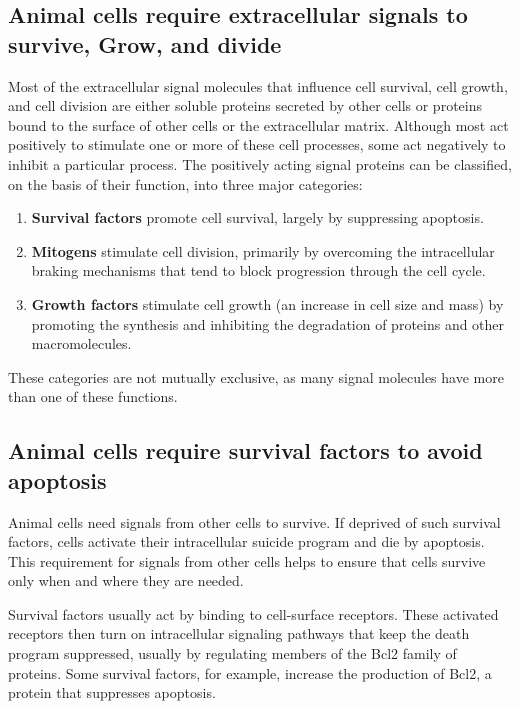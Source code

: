\subsection{Animal cells require extracellular signals to survive, Grow, and divide}

Most of the extracellular signal molecules that influence cell survival, cell
growth, and cell division are either soluble proteins secreted by other
cells or proteins bound to the surface of other cells or the extracellular
matrix. Although most act positively to stimulate one or more of these
cell processes, some act negatively to inhibit a particular process. The
positively acting signal proteins can be classified, on the basis of their
function, into three major categories:

\begin{enumerate}
\item \textbf{Survival factors} promote cell survival, largely by suppressing
apoptosis.
\item \textbf{Mitogens} stimulate cell division, primarily by overcoming the
intracellular braking mechanisms that tend to block progression
through the cell cycle.
\item \textbf{Growth factors} stimulate cell growth (an increase in cell size and
mass) by promoting the synthesis and inhibiting the degradation of
proteins and other macromolecules.
\end{enumerate}

These categories are not mutually exclusive, as many signal molecules
have more than one of these functions.

\subsection{Animal cells require survival factors to avoid apoptosis}

Animal cells need signals from other cells to survive. If deprived of such
survival factors, cells activate their intracellular suicide program and die
by apoptosis. This requirement for signals from other cells helps to ensure
that cells survive only when and where they are needed.

Survival factors usually act by binding to cell-surface receptors. These
activated receptors then turn on intracellular signaling pathways that
keep the death program suppressed, usually by regulating members of the
Bcl2 family of proteins. Some survival factors, for example, increase the
production of Bcl2, a protein that suppresses apoptosis.

